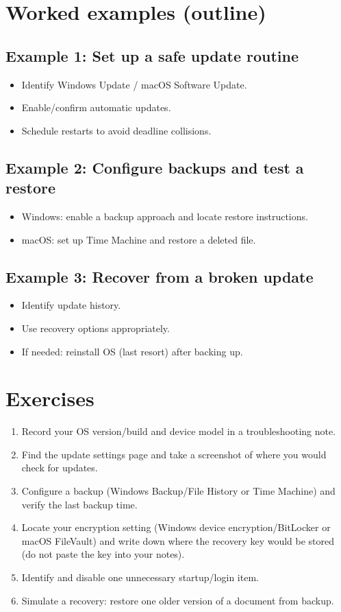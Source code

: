 \section{Worked examples (outline)}
\subsection{Example 1: Set up a safe update routine}
\begin{itemize}
\item Identify Windows Update / macOS Software Update.
\item Enable/confirm automatic updates.
\item Schedule restarts to avoid deadline collisions.
\end{itemize}

\subsection{Example 2: Configure backups and test a restore}
\begin{itemize}
\item Windows: enable a backup approach and locate restore instructions.
\item macOS: set up Time Machine and restore a deleted file.
\end{itemize}

\subsection{Example 3: Recover from a broken update}
\begin{itemize}
\item Identify update history.
\item Use recovery options appropriately.
\item If needed: reinstall OS (last resort) after backing up.
\end{itemize}

\section{Exercises}
\begin{enumerate}
\item Record your OS version/build and device model in a troubleshooting note.
\item Find the update settings page and take a screenshot of where you would check for updates.
\item Configure a backup (Windows Backup/File History or Time Machine) and verify the last backup time.
\item Locate your encryption setting (Windows device encryption/BitLocker or macOS FileVault) and write down where the recovery key would be stored (do not paste the key into your notes).
\item Identify and disable one unnecessary startup/login item.
\item Simulate a recovery: restore one older version of a document from backup.
\end{enumerate}

